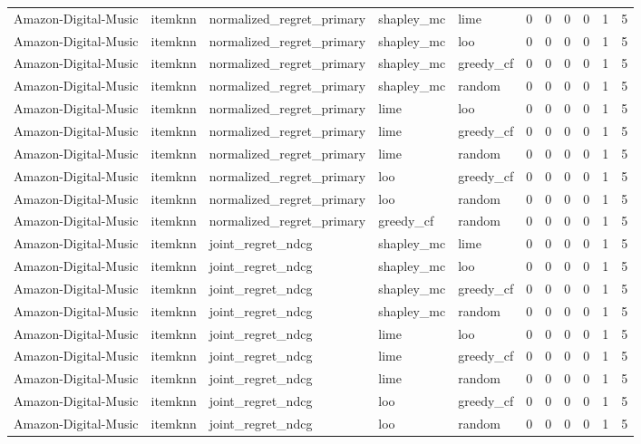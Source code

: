 \begin{table}[t]
{\begin{tabular}{lllllrrrrrr}
Amazon-Digital-Music & itemknn & normalized\_regret\_primary & shapley\_mc & lime & 0 & 0 & 0 & 0 & 1 & 5 \\
Amazon-Digital-Music & itemknn & normalized\_regret\_primary & shapley\_mc & loo & 0 & 0 & 0 & 0 & 1 & 5 \\
Amazon-Digital-Music & itemknn & normalized\_regret\_primary & shapley\_mc & greedy\_cf & 0 & 0 & 0 & 0 & 1 & 5 \\
Amazon-Digital-Music & itemknn & normalized\_regret\_primary & shapley\_mc & random & 0 & 0 & 0 & 0 & 1 & 5 \\
Amazon-Digital-Music & itemknn & normalized\_regret\_primary & lime & loo & 0 & 0 & 0 & 0 & 1 & 5 \\
Amazon-Digital-Music & itemknn & normalized\_regret\_primary & lime & greedy\_cf & 0 & 0 & 0 & 0 & 1 & 5 \\
Amazon-Digital-Music & itemknn & normalized\_regret\_primary & lime & random & 0 & 0 & 0 & 0 & 1 & 5 \\
Amazon-Digital-Music & itemknn & normalized\_regret\_primary & loo & greedy\_cf & 0 & 0 & 0 & 0 & 1 & 5 \\
Amazon-Digital-Music & itemknn & normalized\_regret\_primary & loo & random & 0 & 0 & 0 & 0 & 1 & 5 \\
Amazon-Digital-Music & itemknn & normalized\_regret\_primary & greedy\_cf & random & 0 & 0 & 0 & 0 & 1 & 5 \\
Amazon-Digital-Music & itemknn & joint\_regret\_ndcg & shapley\_mc & lime & 0 & 0 & 0 & 0 & 1 & 5 \\
Amazon-Digital-Music & itemknn & joint\_regret\_ndcg & shapley\_mc & loo & 0 & 0 & 0 & 0 & 1 & 5 \\
Amazon-Digital-Music & itemknn & joint\_regret\_ndcg & shapley\_mc & greedy\_cf & 0 & 0 & 0 & 0 & 1 & 5 \\
Amazon-Digital-Music & itemknn & joint\_regret\_ndcg & shapley\_mc & random & 0 & 0 & 0 & 0 & 1 & 5 \\
Amazon-Digital-Music & itemknn & joint\_regret\_ndcg & lime & loo & 0 & 0 & 0 & 0 & 1 & 5 \\
Amazon-Digital-Music & itemknn & joint\_regret\_ndcg & lime & greedy\_cf & 0 & 0 & 0 & 0 & 1 & 5 \\
Amazon-Digital-Music & itemknn & joint\_regret\_ndcg & lime & random & 0 & 0 & 0 & 0 & 1 & 5 \\
Amazon-Digital-Music & itemknn & joint\_regret\_ndcg & loo & greedy\_cf & 0 & 0 & 0 & 0 & 1 & 5 \\
Amazon-Digital-Music & itemknn & joint\_regret\_ndcg & loo & random & 0 & 0 & 0 & 0 & 1 & 5 \\

\end{tabular}}
\end{table}
